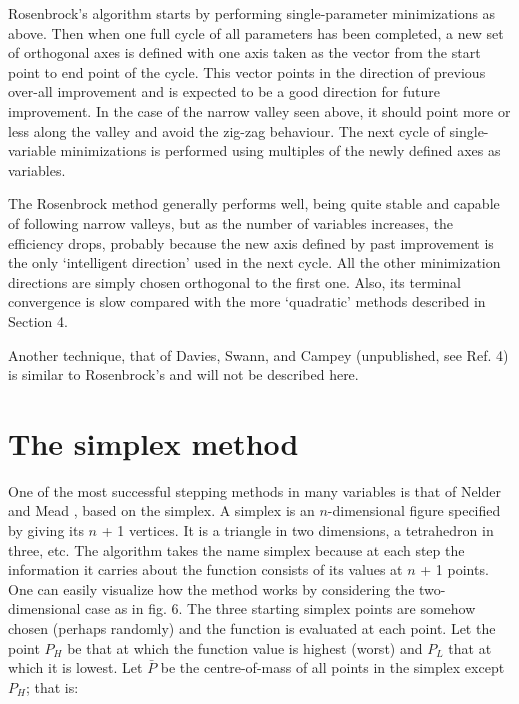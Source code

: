      Rosenbrock's algorithm \cite{Rose} starts by performing single-parameter
minimizations as above.  Then when one full cycle of all parameters has
been completed, a new set of orthogonal axes is defined with one axis
taken as the vector from the start point to end point of the cycle.
This vector points in the direction of previous over-all improvement and
is expected to be a good direction for future improvement.  In the case
of the narrow valley seen above, it should point more or less along the
valley and avoid the zig-zag behaviour.  The next cycle of single-variable
 minimizations is performed using multiples of the newly defined
axes as variables.
 
     The Rosenbrock method generally performs well, being quite stable
and capable of following narrow valleys, but as the number of variables
increases, the efficiency drops, probably because the new axis defined
by past improvement is the only `intelligent direction' used in the next cycle. All the other
minimization directions are simply chosen orthogonal to the first one. Also, its terminal
convergence is slow compared with the more `quadratic' methods described in Section 4.
 
 
     Another technique, that of Davies, Swann, and Campey \cite{Dixo} (unpublished,
see Ref. 4) is similar to Rosenbrock's and will not be described here.
 
 
\section{The simplex method}
 
     One of the most successful stepping methods in many variables is
that of Nelder and Mead \cite{Neld}, based on the simplex.  A simplex is an 
$n$-dimensional figure specified by giving its $n$ + 1 vertices.  It is a
triangle in two dimensions, a tetrahedron in three, etc.  The algorithm
takes the name simplex because at each step the information it carries
about the function consists of its values at $n$ + 1 points.  One can
easily visualize how the method works by considering the
two-dimensional
case as in fig. 6.  The three starting simplex points are
somehow  chosen (perhaps randomly) and the function is evaluated at each
point.  Let the point $P_H$ be that at which the function value is highest
(worst) and $P_L$ that at which it is lowest. Let $\bar{P}$ be the centre-of-mass
of all points in the simplex except $P_H$;  that is:
 
